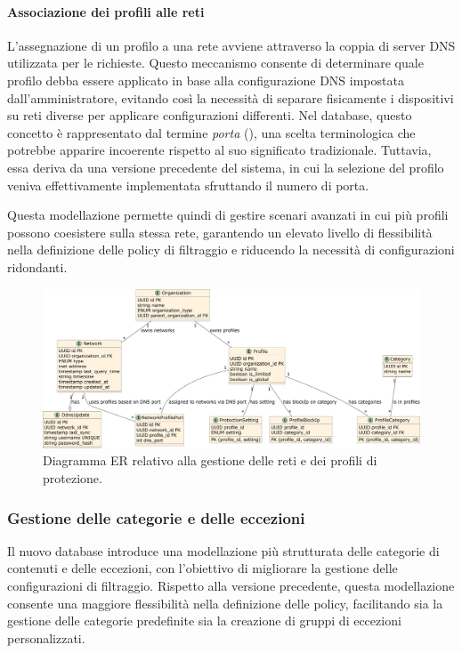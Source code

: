 \paragraph{Associazione dei profili alle reti}
L’assegnazione di un profilo a una rete avviene attraverso la coppia di server DNS utilizzata per le richieste. Questo meccanismo consente di determinare quale profilo debba essere applicato in base alla configurazione DNS impostata dall’amministratore, evitando così la necessità di separare fisicamente i dispositivi su reti diverse per applicare configurazioni differenti. Nel database, questo concetto è rappresentato dal termine \emph{porta} (), una scelta terminologica che potrebbe apparire incoerente rispetto al suo significato tradizionale. Tuttavia, essa deriva da una versione precedente del sistema, in cui la selezione del profilo veniva effettivamente implementata sfruttando il numero di porta.

Questa modellazione permette quindi di gestire scenari avanzati in cui più profili possono coesistere sulla stessa rete, garantendo un elevato livello di flessibilità nella definizione delle policy di filtraggio e riducendo la necessità di configurazioni ridondanti.

\begin{figure}
  \centering
  \includegraphics[width=1\textwidth]{figures/db-network-profile.pdf}
  \caption{Diagramma ER relativo alla gestione delle reti e dei profili di protezione.}
  \label{fig:network-profiles}
\end{figure}

\subsubsection{Gestione delle categorie e delle eccezioni}
Il nuovo database introduce una modellazione più strutturata delle categorie di contenuti e delle eccezioni, con l'obiettivo di migliorare la gestione delle configurazioni di filtraggio. Rispetto alla versione precedente, questa modellazione consente una maggiore flessibilità nella definizione delle policy, facilitando sia la gestione delle categorie predefinite sia la creazione di gruppi di eccezioni personalizzati.

